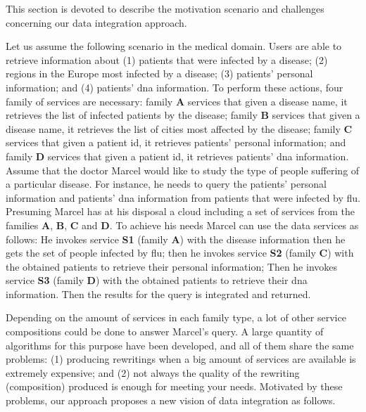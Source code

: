 This section is devoted to describe the motivation scenario and challenges
concerning our data integration approach.
%

Let us assume the following scenario in the medical domain. 
Users are able to retrieve information about (1) patients that were infected by a disease; 
(2) regions in the Europe most infected by a disease; 
(3) patients' personal information; and 
(4) patients' dna information.
To perform these actions, four family of services are necessary: family \textbf{A} services that given a disease name, it retrieves the list of infected patients by the disease; family \textbf{B} services that given a disease name, it retrieves the list of cities most affected by the disease; family \textbf{C} services that given a patient id, it retrieves patients' personal information; and family \textbf{D} services that given a patient id, it retrieves patients' dna information. Assume that the doctor Marcel would like to study the type of people suffering of a particular disease. For instance, he needs to query the patients' personal information and patients' dna information from patients that were infected by flu. Presuming Marcel has at his disposal a cloud including a set of services from the families \textbf{A}, \textbf{B}, \textbf{C} and \textbf{D}. To achieve his needs Marcel can use the data services  as follows: He invokes service \textbf{S1} (family \textbf{A}) with the disease information then he gets the set of people infected by flu; then he invokes service \textbf{S2} (family \textbf{C}) with the obtained patients to retrieve their personal information; Then he invokes service \textbf{S3} (family \textbf{D}) with the obtained patients to retrieve their dna information. Then the results for the query is integrated and returned.

Depending on the amount of services in each family type, a lot of other service compositions could be done to answer Marcel's query. A large quantity of algorithms for this purpose have been developed, and all of them share the same problems: (1) producing rewritings when a big amount of services are available is extremely expensive; and (2) not always the quality of the rewriting (composition) produced is enough for meeting your needs.
Motivated by these problems, our approach proposes a new vision of data integration as follows.

